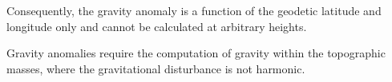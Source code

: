 \documentclass[paper,twocolumn,twoside]{geophysics}
\begin{document}
Consequently, the gravity anomaly is a function of
the geodetic latitude and longitude only and cannot
be calculated at arbitrary heights.


Gravity anomalies require the computation of gravity
within the topographic masses, where the gravitational
disturbance is not harmonic.






\clearpage

\end{document}
